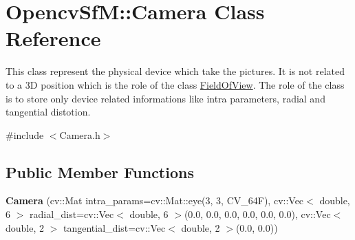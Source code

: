 \hypertarget{class_opencv_sf_m_1_1_camera}{
\section{OpencvSfM::Camera Class Reference}
\label{class_opencv_sf_m_1_1_camera}
}


This class represent the physical device which take the pictures. It is not related to a 3D position which is the role of the class \hyperlink{class_opencv_sf_m_1_1_field_of_view}{FieldOfView}. The role of the class is to store only device related informations like intra parameters, radial and tangential distotion.  




{\ttfamily \#include $<$Camera.h$>$}

\subsection*{Public Member Functions}
\begin{DoxyCompactItemize}
\item 
\hypertarget{class_opencv_sf_m_1_1_camera_a5c689d729d8a8bee7b3f57d5dd764cd7}{
{\bfseries Camera} (cv::Mat intra\_\-params=cv::Mat::eye(3, 3, CV\_\-64F), cv::Vec$<$ double, 6 $>$ radial\_\-dist=cv::Vec$<$ double, 6 $>$(0.0, 0.0, 0.0, 0.0, 0.0, 0.0), cv::Vec$<$ double, 2 $>$ tangential\_\-dist=cv::Vec$<$ double, 2 $>$(0.0, 0.0))}
\label{class_opencv_sf_m_1_1_camera_a5c689d729d8a8bee7b3f57d5dd764cd7}

\end{DoxyCompactItemize}
